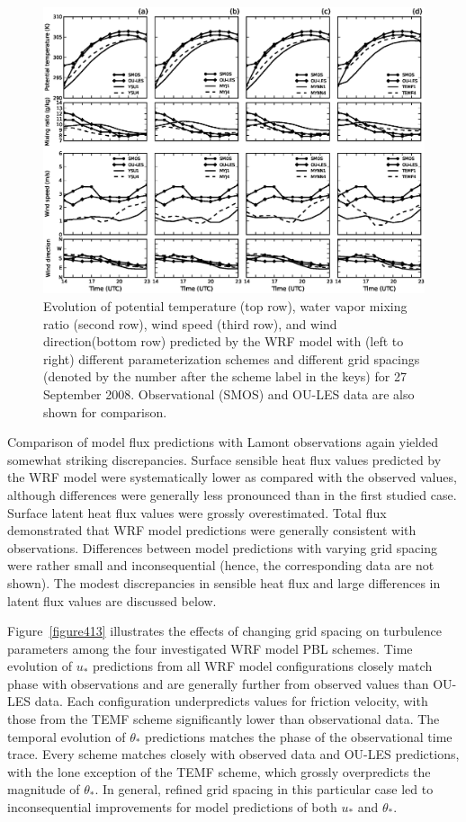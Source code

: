 \begin{figure}[ht!]
\begin{center}
\includegraphics[width=\textwidth]{figures/chapter4/meteogram_grid_20080927}
\end{center}
\caption{Evolution of potential temperature (top row), water vapor mixing ratio (second row), wind speed (third row), and wind direction(bottom row) predicted by the WRF model with (left to right) different parameterization schemes and different grid spacings (denoted by the number after the scheme label in the keys) for 27 September 2008. Observational (SMOS) and OU-LES data are also shown for comparison.}
\label{figure412}
\end{figure}


Comparison of model flux predictions with Lamont observations again yielded somewhat striking discrepancies. Surface sensible heat flux values predicted by the WRF model were systematically lower as compared with the observed values, although differences were generally less pronounced than in the first studied case. Surface latent heat flux values were grossly overestimated. Total flux demonstrated that WRF model predictions were generally consistent with observations. Differences between model predictions with varying grid spacing were rather small and inconsequential (hence, the corresponding data are not shown). The modest discrepancies in sensible heat flux and large differences in latent flux values are discussed below. 

Figure~\ref{figure413} illustrates the effects of changing grid spacing on turbulence parameters among the four investigated WRF model PBL schemes. Time evolution of $u_*$ predictions from all WRF model configurations closely match phase with observations and are generally further from observed values than OU-LES data. Each configuration underpredicts values for friction velocity, with those from the TEMF scheme significantly lower than observational data. The temporal evolution of $\theta_*$ predictions matches the phase of the observational time trace. Every scheme matches closely with observed data and OU-LES predictions, with the lone exception of the TEMF scheme, which grossly overpredicts the magnitude of $\theta_*$. In general, refined grid spacing in this particular case led to inconsequential improvements for model predictions of both $u_*$ and $\theta_*$. 


